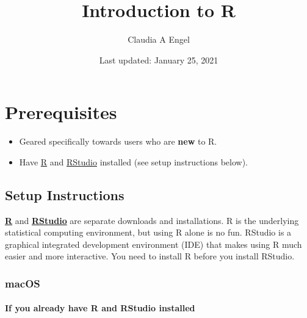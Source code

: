 \documentclass[
]{book}
\title{Introduction to R}
\author{Claudia A Engel}
\date{Last updated: January 25, 2021}
\providecommand{\tightlist}{%
  \setlength{\itemsep}{0pt}\setlength{\parskip}{0pt}}
\begin{document}
\maketitle

{
\setcounter{tocdepth}{1}
\tableofcontents
}
\hypertarget{prerequisites}{%
\chapter*{Prerequisites}\label{prerequisites}}

\begin{itemize}
\tightlist
\item
  Geared specifically towards users who are \textbf{new} to R.\\
\item
  Have \href{https://cran.r-project.org/}{R} and \href{https://www.rstudio.com/}{RStudio} installed (see setup instructions below).
\end{itemize}

\hypertarget{setup-instructions}{%
\section*{Setup Instructions}\label{setup-instructions}}

\href{https://cran.r-project.org/}{\textbf{R}} and \href{https://www.rstudio.com/}{\textbf{RStudio}} are separate downloads and installations. R is the
underlying statistical computing environment, but using R alone is no
fun. RStudio is a graphical integrated development environment (IDE) that makes
using R much easier and more interactive. You need to install R before you
install RStudio.

\hypertarget{macos}{%
\subsection*{macOS}\label{macos}}

\hypertarget{if-you-already-have-r-and-rstudio-installed}{%
\subsubsection*{If you already have R and RStudio installed}\label{if-you-already-have-r-and-rstudio-installed}}
\end{document}
